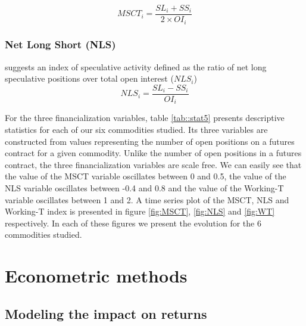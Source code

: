 \documentclass[12pt]{article}
\begin{document}
\begin{equation} \label{eqn:MSCT}
MSCT_i=\frac{SL_i+SS_i}{2 \times OI_i}
\end{equation}

\subsubsection{Net Long Short (NLS)}
\citet{hedegaard2011margins} suggests an index of speculative activity defined as the ratio of net long speculative positions over total open interest ($NLS_i$)
\begin{equation} \label{eqn:NLS}
NLS_i=\frac{SL_i-SS_i}{OI_i}
\end{equation}

For the three financialization variables, table \ref{tab::stat5} presents descriptive statistics for each of our six commodities studied. Its three variables are constructed from values representing the number of open positions on a futures contract for a given commodity. Unlike the number of open positions in a futures contract, the three financialization variables are scale free. We can easily see that the value of the MSCT variable oscillates between 0 and 0.5, the value of the NLS variable oscillates between -0.4 and 0.8 and the value of the Working-T variable oscillates between 1 and 2. A time series plot of the MSCT, NLS and Working-T index is presented in figure \ref{fig:MSCT}, \ref{fig:NLS} and \ref{fig:WT} respectively. In each of these figures we present the evolution for the 6 commodities studied.



\section{Econometric methods}
\subsection{Modeling the impact on returns}\label{return}
\end{document}
